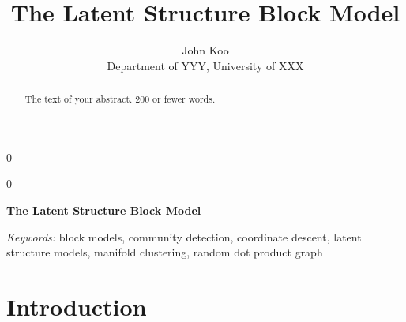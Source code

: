 \documentclass[12pt]{article}
\newcommand{\blind}{0}
\begin{document}
\def\spacingset#1{\renewcommand{\baselinestretch}%
{#1}\small\normalsize} \spacingset{1}



\blind
{
  \title{\bf The Latent Structure Block Model}

  \author{
        John Koo \\
    Department of YYY, University of XXX\\
      }
  \maketitle
} \fi

\blind
{
  \bigskip
  \bigskip
  \bigskip
  \begin{center}
    {\LARGE\bf The Latent Structure Block Model}
  \end{center}
  \medskip
} \fi

\bigskip
\begin{abstract}
The text of your abstract. 200 or fewer words.
\end{abstract}

\noindent%
{\it Keywords:} block models, community detection, coordinate descent,
latent structure models, manifold clustering, random dot product graph

\vfill

\newpage
\spacingset{1.9} %

\newcommand{\diag}{\mathrm{diag}}
\newcommand{\tr}{\mathrm{Tr}}
\newcommand{\blockdiag}{\mathrm{blockdiag}}
\newcommand{\indep}{\stackrel{\mathrm{ind}}{\sim}}
\newcommand{\iid}{\stackrel{\mathrm{iid}}{\sim}}
\newcommand{\Bernoulli}{\mathrm{Bernoulli}}
\newcommand{\Betadist}{\mathrm{Beta}}
\newcommand{\BG}{\mathrm{BernoulliGraph}}
\newcommand{\Uniform}{\mathrm{Uniform}}
\newcommand{\PABM}{\mathrm{PABM}}
\newcommand{\RDPG}{\mathrm{RDPG}}
\newcommand{\GRDPG}{\mathrm{GRDPG}}
\newcommand{\Multinomial}{\mathrm{Multinomial}}
\newtheorem{theorem}{Theorem}
\newtheorem{lemma}{Lemma}
\newtheorem{corollary}{Corollary}
\newtheorem{proposition}{Proposition}
\theoremstyle{remark}
\newtheorem{remark}{Remark}
\theoremstyle{definition}
\newtheorem{definition}{Definition}
\newtheorem{example}{Example}
\newcommand{\dd}{\mathrm{d}}
\newcommand{\as}{\stackrel{\mathrm{a.s.}}{\to}}
\newcommand{\ER}{\text{Erd\"{o}s-R\'{e}nyi}}

\hypertarget{introduction}{%
\section{Introduction}\label{introduction}}
\end{document}
